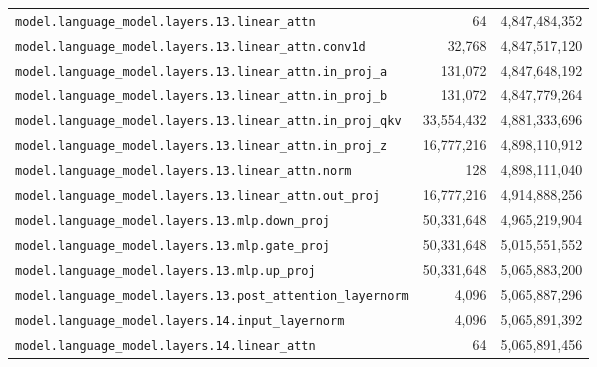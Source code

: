 \documentclass[10pt,a4paper]{article}
\theoremstyle{definition}
\begin{document}
\begin{appendices}
\begin{longtable}{p{9.5cm}rr}
\texttt{model.\allowbreak{}language\_model.\allowbreak{}layers.\allowbreak{}13.\allowbreak{}linear\_attn} & 64 & 4,847,484,352 \\
\texttt{model.\allowbreak{}language\_model.\allowbreak{}layers.\allowbreak{}13.\allowbreak{}linear\_attn.\allowbreak{}conv1d} & 32,768 & 4,847,517,120 \\
\texttt{model.\allowbreak{}language\_model.\allowbreak{}layers.\allowbreak{}13.\allowbreak{}linear\_attn.\allowbreak{}in\_proj\_a} & 131,072 & 4,847,648,192 \\
\texttt{model.\allowbreak{}language\_model.\allowbreak{}layers.\allowbreak{}13.\allowbreak{}linear\_attn.\allowbreak{}in\_proj\_b} & 131,072 & 4,847,779,264 \\
\texttt{model.\allowbreak{}language\_model.\allowbreak{}layers.\allowbreak{}13.\allowbreak{}linear\_attn.\allowbreak{}in\_proj\_qkv} & 33,554,432 & 4,881,333,696 \\
\texttt{model.\allowbreak{}language\_model.\allowbreak{}layers.\allowbreak{}13.\allowbreak{}linear\_attn.\allowbreak{}in\_proj\_z} & 16,777,216 & 4,898,110,912 \\
\texttt{model.\allowbreak{}language\_model.\allowbreak{}layers.\allowbreak{}13.\allowbreak{}linear\_attn.\allowbreak{}norm} & 128 & 4,898,111,040 \\
\texttt{model.\allowbreak{}language\_model.\allowbreak{}layers.\allowbreak{}13.\allowbreak{}linear\_attn.\allowbreak{}out\_proj} & 16,777,216 & 4,914,888,256 \\
\texttt{model.\allowbreak{}language\_model.\allowbreak{}layers.\allowbreak{}13.\allowbreak{}mlp.\allowbreak{}down\_proj} & 50,331,648 & 4,965,219,904 \\
\texttt{model.\allowbreak{}language\_model.\allowbreak{}layers.\allowbreak{}13.\allowbreak{}mlp.\allowbreak{}gate\_proj} & 50,331,648 & 5,015,551,552 \\
\texttt{model.\allowbreak{}language\_model.\allowbreak{}layers.\allowbreak{}13.\allowbreak{}mlp.\allowbreak{}up\_proj} & 50,331,648 & 5,065,883,200 \\
\texttt{model.\allowbreak{}language\_model.\allowbreak{}layers.\allowbreak{}13.\allowbreak{}post\_attention\_layernorm} & 4,096 & 5,065,887,296 \\
\texttt{model.\allowbreak{}language\_model.\allowbreak{}layers.\allowbreak{}14.\allowbreak{}input\_layernorm} & 4,096 & 5,065,891,392 \\
\texttt{model.\allowbreak{}language\_model.\allowbreak{}layers.\allowbreak{}14.\allowbreak{}linear\_attn} & 64 & 5,065,891,456 \\

\end{longtable}
\end{appendices}
\end{document}
